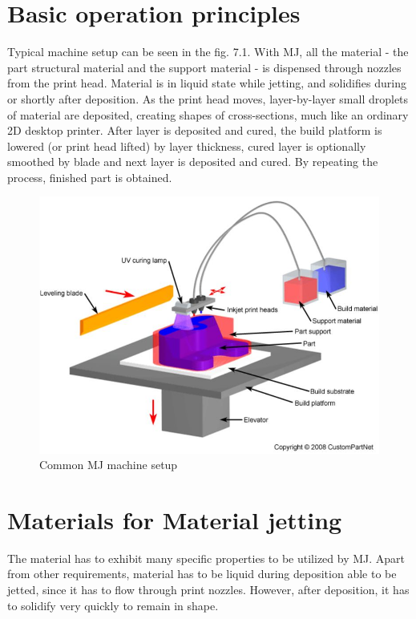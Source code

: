 \documentclass[a4paper, 11pt, reqno]{report}
\begin{document}
\section{Basic operation principles}
Typical machine setup can be seen in the fig. 7.1. With MJ, all the material - the part structural material and the support material - is dispensed through nozzles from the print head. Material is in liquid state while jetting, and solidifies during or shortly after deposition.  As the print head moves, layer-by-layer small droplets of material are deposited, creating shapes of cross-sections, much like an ordinary 2D desktop printer. After layer is deposited and cured, the build platform is lowered (or print head lifted) by layer thickness, cured layer is optionally smoothed by blade and next layer is deposited and cured. By repeating the process, finished part is obtained.
\begin{figure}[b!]
	\centering
	\includegraphics[scale=0.8]{MJmachine}
	\caption{Common MJ machine setup \cite{custompart}}
\end{figure}

\section{Materials for Material jetting}
The material has to exhibit many specific properties to be utilized by MJ. Apart from other requirements, material has to be liquid during deposition able to be jetted, since it has to flow through print nozzles. However, after deposition, it has to solidify very quickly to remain in shape.
\end{document}
